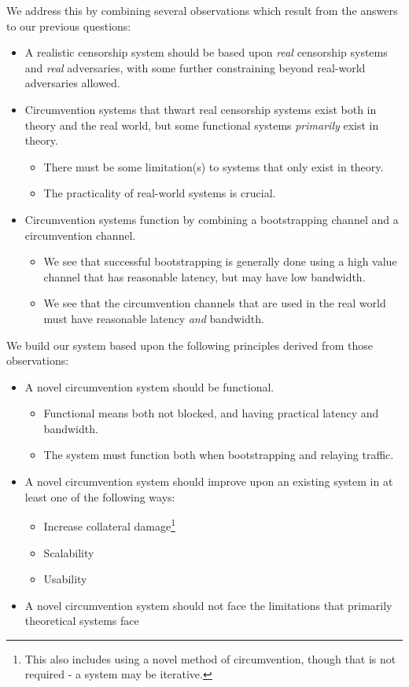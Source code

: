 \documentclass[12pt]{report}
\begin{document}
We address this by combining several observations which result from the answers to our previous questions:
\begin{itemize}
  \item A realistic censorship system should be based upon \emph{real} censorship systems and \emph{real} adversaries, with some further constraining beyond real-world adversaries allowed.
  \item Circumvention systems that thwart real censorship systems exist both in theory and the real world, but some functional systems \emph{primarily} exist in theory.
    \begin{itemize}
    \item There must be some limitation(s) to systems that only exist in theory.
    \item The practicality of real-world systems is crucial.
    \end{itemize}
  \item Circumvention systems function by combining a bootstrapping channel and a circumvention channel.
    \begin{itemize}
    \item We see that successful bootstrapping is generally done using a high value channel that has reasonable latency, but may have low bandwidth.
    \item We see that the circumvention channels that are used in the real world must have reasonable latency \emph{and} bandwidth.
    \end{itemize}
\end{itemize}
We build our system based upon the following principles derived from those observations:
\begin{itemize}
  \item A novel circumvention system should be functional.
    \begin{itemize}
    \item Functional means both not blocked, and having practical latency and bandwidth.
    \item The system must function both when bootstrapping and relaying traffic.
    \end{itemize}
  \item A novel circumvention system should improve upon an existing system in at least one of the following ways:
    \begin{itemize}
    \item Increase collateral damage\footnote{This also includes using a novel method of circumvention, though that is not required - a system may be iterative.}
    \item Scalability
    \item Usability
    \end{itemize}
  \item A novel circumvention system should not face the limitations that primarily theoretical systems face
\end{itemize}
\end{document}
